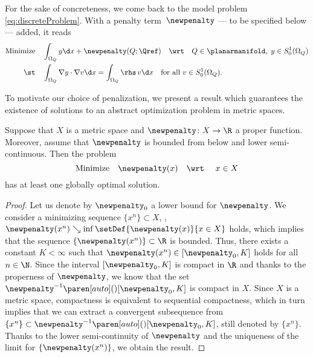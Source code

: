 For the sake of concreteness, we come back to the model problem \eqref{eq:discreteProblem}.
With a penalty term~$\newpenalty$ --- to be specified below --- added, it reads
\begin{equation}
	\label{eq:penalizedProblem}
	\begin{aligned}
		\text{Minimize}
		&
		\quad
		\int_{\Omega_Q} y \d x
		+
		\newpenalty(Q;\Qref)
		\quad
		\text{\wrt}
		\quad
		Q \in \planarmanifold
		,
		\;
		y \in S^1_0(\Omega_Q)
		\\
		\text{\st}
		&
		\quad
		\int_{\Omega_Q} \nabla y \cdot \nabla v \d x
		=
		\int_{\Omega_Q} \rhs \, v \d x
		\quad
		\text{for all }
		v \in S^1_0(\Omega_Q)
		.
	\end{aligned}
\end{equation}

To motivate our choice of penalization, we present a result which guarantees the existence of solutions to an abstract optimization problem in metric spaces.
\begin{proposition}
	\label{proposition:existenceSolutionsProperFunction}
	Suppose that $X$ is a metric space and $\newpenalty \colon X \to \R$ a proper function.
	Moreover, assume that $\newpenalty$ is bounded from below and lower semi-continuous.
	Then the problem
	\begin{equation}
		\label{eq:minimizationProperFunction}
		\text{Minimize}
		\quad
		\newpenalty(x)
		\quad
		\text{\wrt }
		\quad
		x \in X
	\end{equation}
	has at least one globally optimal solution.
\end{proposition}
\begin{proof}
	Let us denote by $\newpenalty_0$ a lower bound for $\newpenalty$.
	We consider a minimizing sequence $\{x^n\}\subset X$, \ie, $\newpenalty(x^n) \searrow \inf \setDef{\newpenalty(x)}{x \in X}$ holds, which implies that the sequence $\{\newpenalty(x^n)\} \subset \R$ is bounded.
	Thus, there exists a constant $K < \infty$ such that $\newpenalty(x^n) \in [\newpenalty_0, K]$ holds for all $n \in \N$.
	Since the interval $[\newpenalty_0, K]$ is compact in $\R$ and thanks to the properness of $\newpenalty$, we know that the set $\newpenalty^{-1}\paren[auto](){[\newpenalty_0, K]}$ is compact in $X$.
	Since $X$ is a metric space, compactness is equivalent to sequential compactness, which in turn implies that we can extract a convergent subsequence from $\{x^n\} \subset \newpenalty^{-1}\paren[auto](){[\newpenalty_0, K]}$, still denoted by $\{x^n\}$.
	Thanks to the lower semi-continuity of $\newpenalty$ and the uniqueness of the limit for $\{\newpenalty(x^n)\}$, we obtain the result.
\end{proof}


